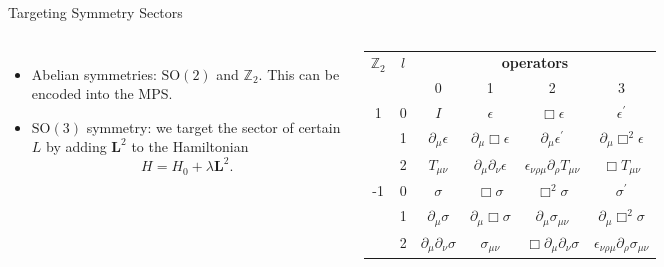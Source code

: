 \documentclass[xcolor=table, 11pt, aspectratio=169]{beamer}
\begin{document}
\begin{frame}{Targeting Symmetry Sectors}
  \begin{columns}
    \begin{itemize}
    \item Abelian symmetries: $\mathrm{SO}(2)$ and $\mathbb Z_2$. This can be encoded into the MPS.
    \item $\mathrm{SO}(3)$ symmetry: we target the sector of certain $L$ by adding $\bm L^2$ to the Hamiltonian
      \[H = H_0 + \lambda \bm{L}^2.\]
    \end{itemize}
    \begin{tabular}{|c|c|c|c|c|c|}
      \hline
      \multirow{2}{*}{$\mathbb Z_2$} & \multirow{2}{*}{$l$} & \multicolumn{4}{|c|}{\textbf{operators}} \\
      \cline{3-6}
                                     & & 0 & 1 & 2 & 3\\
      \hline
      \multirow{3}{*}{1} & 0 & $I$ & \alert{$\epsilon$} & $\Box\epsilon$ & \alert{$\epsilon^\prime$} \\
      \cline{2-6}               
                                     & 1 & $\partial_\mu\epsilon$ & $\partial_\mu\Box\epsilon$ & $\partial_\mu\epsilon^\prime$ & $\partial_\mu\Box^2\epsilon$ \\    
      \cline{2-6} 
                                     & 2 & \alert{$T_{\mu\nu}$} & $\partial_\mu\partial_\nu\epsilon$ & $\epsilon_{\nu\rho\mu}\partial_\rho T_{\mu\nu}$ & $\Box T_{\mu\nu}$ \\                                                            
      \hline
      \multirow{3}{*}{-1} & 0 & \alert{$\sigma$} & $\Box\sigma$ & $\Box^2\sigma$ & \alert{$\sigma^\prime$} \\ 
      \cline{2-6}
                                     & 1 & $\partial_\mu\sigma$ & $\partial_\mu\Box\sigma$ & $\partial_{\mu}\sigma_{\mu\nu}$ & $\partial_\mu\Box^2\sigma$ \\  
      \cline{2-6}
                                     & 2 & $\partial_{\mu}\partial_{\nu}\sigma$ & \alert{$\sigma_{\mu\nu}$} & $\Box\partial_\mu\partial_\nu\sigma$ & $\epsilon_{\nu\rho\mu}\partial_\rho\sigma_{\mu\nu}$ \\ 
            \hline
        \end{tabular}
  \end{columns}
\end{frame}
\end{document}
